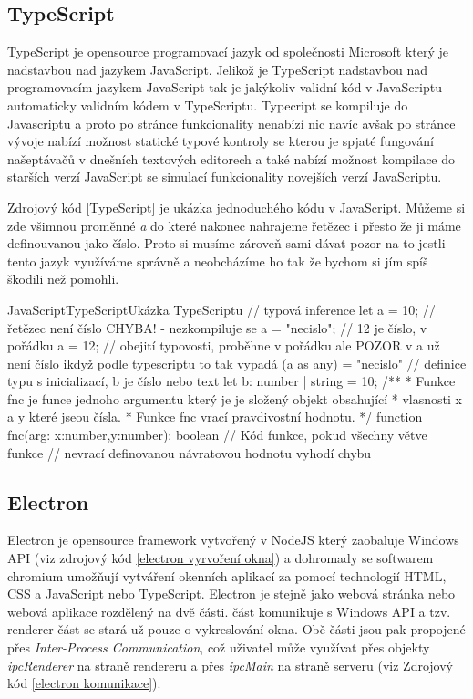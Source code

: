 \documentclass[
  biblatex,
  glossaries,
  index
]{kidiplom}
\begin{document}
\subsection{TypeScript}
TypeScript je opensource programovací jazyk od společnosti Microsoft který je nadstavbou nad jazykem JavaScript.
Jelikož je TypeScript nadstavbou nad programovacím jazykem JavaScript tak je jakýkoliv validní kód v JavaScriptu automaticky validním kódem v TypeScriptu.
Typecript se kompiluje do Javascriptu a proto po stránce funkcionality nenabízí nic navíc avšak po stránce vývoje nabízí možnost statické typové kontroly
se kterou je spjaté fungování našeptávačů v dnešních textových editorech a také nabízí možnost kompilace do starších verzí JavaScript se simulací funkcionality novejších verzí JavaScriptu.

Zdrojový kód \ref{TypeScript} je ukázka jednoduchého kódu v JavaScript. Můžeme
si zde všimnou proměnné \textit{a} do které nakonec nahrajeme řetězec i přesto že 
ji máme definouvanou jako číslo. Proto si musíme zároveň sami dávat pozor na to jestli
tento jazyk využíváme správně a neobcházíme ho tak že bychom si jím spíš škodili než pomohli.
\begin{kicode}{JavaScript}{TypeScript}{Ukázka TypeScriptu}
  // typová inference 
  let a = 10;
  // řetězec není číslo CHYBA! - nezkompiluje se
  a = "necislo";
  // 12 je číslo, v pořádku
  a = 12; 
  // obejití typovosti, proběhne v pořádku ale POZOR v a už není číslo ikdyž podle typescriptu to tak vypadá
  (a as any) = "necislo"
  // definice typu s inicializací, b je číslo nebo text
  let b: number | string = 10;
  /**
   * Funkce fnc je funce jednoho argumentu který je je složený objekt obsahující
   * vlasnosti x a y které jseou čísla.
   * Funkce fnc vrací pravdivostní hodnotu.
   */
  function fnc(arg: {x:number,y:number}): boolean {
      // Kód funkce, pokud všechny větve funkce 
      // nevrací definovanou návratovou hodnotu vyhodí chybu
  }

\end{kicode}

\subsection{Electron}
Electron je opensource framework vytvořený v NodeJS který 
zaobaluje Windows API (viz zdrojový kód \ref{electron vyrvoření okna}) a dohromady se softwarem chromium umožňují 
vytváření okenních aplikací za pomocí technologií HTML, CSS a JavaScript nebo TypeScript.
Electron je stejně jako webová stránka nebo webová aplikace rozdělený
na dvě části.  část komunikuje s Windows API a 
 tzv. renderer část se stará už pouze o vykreslování 
okna. Obě části jsou pak propojené přes \textit{Inter-Process Communication}, 
což uživatel může využívat přes objekty \textit{ipcRenderer} na straně rendereru
a přes \textit{ipcMain} na straně serveru (viz Zdrojový kód \ref{electron komunikace}).
\end{document}
